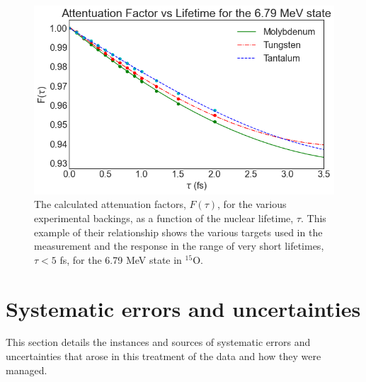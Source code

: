 \begin{figure}
\centering
\includegraphics[width=\linewidth]{figures/attFacExample.png}
\caption{The calculated attenuation factors, $F(\tau)$, for the various experimental backings, as a function of the nuclear lifetime, $\tau$. This example of their relationship shows the various targets used in the measurement  and the response in the range of very short lifetimes, $\tau < 5$ fs, for the 6.79 MeV state in $^{15}$O. }
\label{fig: attFacExample}
\end{figure}



\section{Systematic errors and uncertainties}
\label{sec: systematicErrors}

This section details the instances and sources of systematic errors and uncertainties that arose in this treatment of the data and how they were managed.

